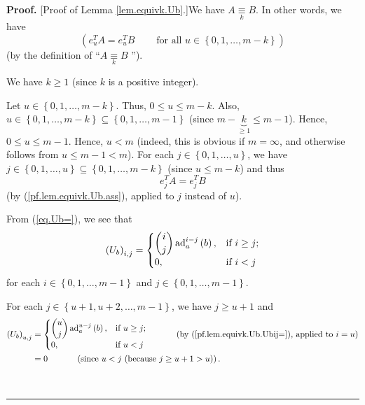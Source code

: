 \documentclass[numbers=enddot,12pt,final,onecolumn,notitlepage]{scrartcl}%
\theoremstyle{definition}
\newenvironment{proof}[1][Proof]{\noindent\textbf{#1.} }{\ \rule{0.5em}{0.5em}}
\newenvironment{verlong}{}{}
\begin{document}
\begin{proof}
[Proof of Lemma \ref{lem.equivk.Ub}.]We have $A\underset{k}{\equiv}B$. In
other words, we have%
\begin{equation}
\left(  e_{u}^{T}A=e_{u}^{T}B\ \ \ \ \ \ \ \ \ \ \text{for all }u\in\left\{
0,1,\ldots,m-k\right\}  \right)  \label{pf.lem.equivk.Ub.ass}%
\end{equation}
(by the definition of \textquotedblleft$A\underset{k}{\equiv}B$%
\textquotedblright).

\begin{verlong}
We have $k\geq1$ (since $k$ is a positive integer).
\end{verlong}

Let $u\in\left\{  0,1,\ldots,m-k\right\}  $. Thus, $0\leq u\leq m-k$. Also,
$u\in\left\{  0,1,\ldots,m-k\right\}  \subseteq\left\{  0,1,\ldots
,m-1\right\}  $ (since $m-\underbrace{k}_{\geq1}\leq m-1$). Hence, $0\leq
u\leq m-1$. Hence, $u<m$ (indeed, this is obvious if $m=\infty$, and otherwise
follows from $u\leq m-1<m$). For each $j\in\left\{  0,1,\ldots,u\right\}  $,
we have $j\in\left\{  0,1,\ldots,u\right\}  \subseteq\left\{  0,1,\ldots
,m-k\right\}  $ (since $u\leq m-k$) and thus%
\begin{equation}
e_{j}^{T}A=e_{j}^{T}B\label{pf.lem.equivk.Ub.assv}%
\end{equation}
(by (\ref{pf.lem.equivk.Ub.ass}), applied to $j$ instead of $u$).

From (\ref{eq.Ub=}), we see that%
\begin{equation}
\left(  U_{b}\right)  _{i,j}=%
\begin{cases}
\dbinom{i}{j}\operatorname*{ad}\nolimits_{a}^{i-j}\left(  b\right)  , &
\text{if }i\geq j;\\
0, & \text{if }i<j
\end{cases}
\label{pf.lem.equivk.Ub.Ubij=}%
\end{equation}
for each $i\in\left\{  0,1,\ldots,m-1\right\}  $ and $j\in\left\{
0,1,\ldots,m-1\right\}  $.

For each $j\in\left\{  u+1,u+2,\ldots,m-1\right\}  $, we have $j\geq u+1$ and%
\begin{align}
\left(  U_{b}\right)  _{u,j}  &  =%
\begin{cases}
\dbinom{u}{j}\operatorname*{ad}\nolimits_{a}^{u-j}\left(  b\right)  , &
\text{if }u\geq j;\\
0, & \text{if }u<j
\end{cases}
\ \ \ \ \ \ \ \ \ \ \left(  \text{by (\ref{pf.lem.equivk.Ub.Ubij=}), applied
to }i=u\right) \nonumber\\
&  =0\ \ \ \ \ \ \ \ \ \ \left(  \text{since }u<j\text{ (because }j\geq
u+1>u\text{)}\right)  . \label{pf.lem.equivk.Ub.lav=0}%
\end{align}



\end{proof}
\end{document}
